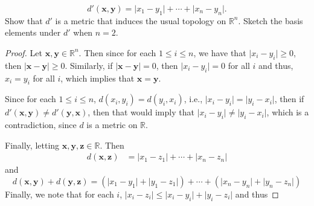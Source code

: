 \documentclass[12pt]{article}
\theoremstyle{definition}
\newcommand{\abs}[1]{\lvert #1 \rvert}
\begin{document}
\begin{enumerate}
\begin{enumerate}[label = (\alph*)]
                    \begin{equation*}
                        d'(\mathbf{x},
                        \mathbf{y})=\abs{x_1-y_1}+\cdots+\abs{x_n-y_n}.
                    \end{equation*}
                  Show that $d'$ is a metric that induces the usual topology on
                  $\mathbb{R}^n$. Sketch the basis elements under $d'$ when
                  $n=2$.
                  \begin{proof}
                      Let $\mathbf{x}, \mathbf{y}\in \mathbb{R}^n$. Then since
                      for each $1\leq i\leq n$, we have that $\abs{x_i-y_i}\geq
                      0$, then $\abs{\mathbf{x}-\mathbf{y}}\geq 0$. Similarly,
                      if $\abs{\mathbf{x}-\mathbf{y}}=0$, then
                      $\abs{x_i-y_i}=0$ for all $i$ and thus, $x_i=y_i$ for all
                      $i$, which implies that
                      $\mathbf{x}=\mathbf{y}$.\par\hspace{4mm} Since for each
                      $1\leq i\leq n$, $d(x_i, y_i)=d(y_i, x_i)$, i.e.,
                      $\abs{x_i-y_i}=\abs{y_i-x_i}$, then if $d'(\mathbf{x},
                      \mathbf{y})\neq d'(\mathbf{y}, \mathbf{x})$, then that
                      would imply that $\abs{x_i-y_i}\neq \abs{y_i-x_i}$, which
                      is a contradiction, since $d$ is a metric on
                      $\mathbb{R}$.\par\hspace{4mm} Finally, letting
                      $\mathbf{x}, \mathbf{y}, \mathbf{z}\in \mathbb{R}$. Then 
                      \begin{equation*}
                          \begin{split}
                              d(\mathbf{x}, \mathbf{z}) &=
                              \abs{x_1-z_1}+\cdots+\abs{x_n-z_n} 
                          \end{split}
                      \end{equation*}
                      and 
                      \begin{equation*}
                          d(\mathbf{x}, \mathbf{y})+d(\mathbf{y}, \mathbf{z})
                          = (\abs{x_1-y_1}+\abs{y_1-z_1})+\cdots+(\abs{x_n-y_n}+\abs{y_n-z_n})
                      \end{equation*}
                      Finally, we note that for each $i$,
                      $\abs{x_i-z_i}\leq\abs{x_i-y_i}+\abs{y_i-z_i}$ and thus

\end{proof}
\end{enumerate}
\end{enumerate}
\end{document}
